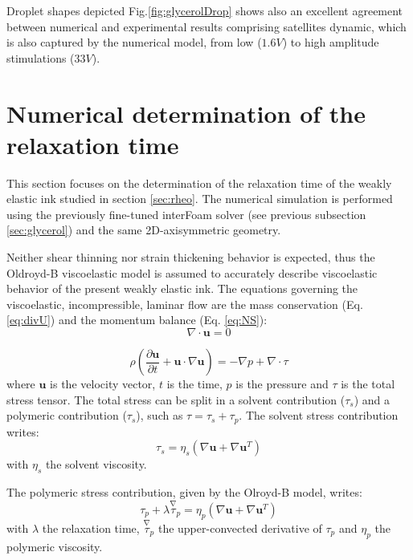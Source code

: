 \documentclass[onecolumn, 12pt]{asme2ej}
\begin{document}
Droplet shapes depicted Fig.\ref{fig:glycerolDrop} shows also an excellent agreement between numerical and experimental results comprising satellites dynamic, which is also captured by the numerical model, from low ($1.6V$) to high amplitude stimulations ($33V$).


\section{Numerical determination of the relaxation time} \label{numericalDetermination}

This section focuses on the determination of the relaxation time of the weakly elastic ink studied in section \ref{sec:rheo}. The numerical simulation  is performed using the previously fine-tuned interFoam solver (see previous subsection \ref{sec:glycerol}) and the same 2D-axisymmetric geometry. 

Neither shear thinning nor strain thickening behavior is expected, thus the Oldroyd-B viscoelastic model \cite{oldroyd1950formulation} is assumed to accurately describe viscoelastic behavior of the present weakly elastic ink. The equations governing the viscoelastic, incompressible, laminar flow are the mass conservation (Eq. \ref{eq:divU}) and the momentum balance (Eq. \ref{eq:NS}):
\begin{equation}\label{eq:divU}
    \nabla \cdot \mathbf{u} = 0
\end{equation}

\begin{equation}\label{eq:NS}
    \rho \left( \frac{\partial \mathbf{u}}{\partial t} + \mathbf{u} \cdot \nabla \mathbf{u} \right) = -\nabla p + \nabla \cdot \tau
\end{equation}
where $\mathbf{u}$ is the velocity vector, $t$ is the time, $p$ is the pressure and $\tau$ is the total stress tensor. The total stress can be split in a solvent contribution ($\tau_s$) and a polymeric contribution ($\tau_s$), such as $\tau= \tau_s + \tau_p$. The solvent stress contribution writes:
\begin{equation}
    \tau_s= \eta_s\left(\nabla \mathbf{u}+ \nabla \mathbf{u}^T \right)
\end{equation}
with $\eta_s$ the solvent viscosity.

The polymeric stress contribution, given by the Olroyd-B model, writes:
\begin{equation}
    \tau_p +\lambda \overset{\nabla}{\tau}_p = \eta_p\left(\nabla \mathbf{u}+ \nabla \mathbf{u}^T \right)
\end{equation}
with $\lambda$ the relaxation time, $\overset{\nabla}{\tau}_p$ the upper-convected derivative of $\tau_p$ and $\eta_p$ the polymeric viscosity.
\end{document}

